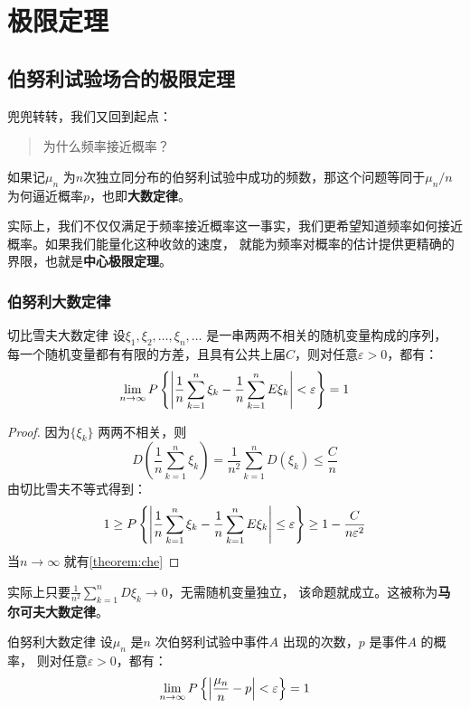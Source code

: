 \chapter{极限定理}
\section{伯努利试验场合的极限定理}
兜兜转转，我们又回到起点：
\begin{quote}
    为什么频率接近概率？
\end{quote}

如果记\(\mu_{n}\) 为\(n\)次独立同分布的伯努利试验中成功的频数，那这个问题等同于\(\mu_{n}/n\)
为何逼近概率\(p\)，也即\textbf{大数定律}。

实际上，我们不仅仅满足于频率接近概率这一事实，我们更希望知道频率如何接近概率。如果我们能量化这种收敛的速度，
就能为频率对概率的估计提供更精确的界限，也就是\textbf{中心极限定理}。

\subsection{伯努利大数定律}
\begin{theorem}[che]{切比雪夫大数定律}
    设\(\xi_{1}, \xi_2, \dots ,\xi_{n},\dots \) 是一串两两不相关的随机变量构成的序列，
    每一个随机变量都有有限的方差，且具有公共上届\(C\)，则对任意\(\varepsilon>0\)，都有：
    \[
        \lim_{n \to \infty} P\left\{\left|\frac{1}{n} \sum_{k=1}^{n} \xi_{k} -
        \frac{1}{n} \sum_{k=1}^{n} E\xi_{k}\right| < \varepsilon\right\} = 1
    \]
\end{theorem}

\begin{proof}
    因为\(\{\xi_{k}\}\) 两两不相关，则\[
        D\left( \frac{1}{n} \sum_{k=1}^{n} \xi_{k} \right) =
        \frac{1}{n^2} \sum_{k=1}^{n} D(\xi_{k}) \leq \frac{C}{n}
    \]
    由切比雪夫不等式得到：
    \[
        1 \geq P\left\{\left|\frac{1}{n} \sum_{k=1}^{n} \xi_{k} -
        \frac{1}{n} \sum_{k=1}^{n} E\xi_{k}\right| \leq  \varepsilon\right\} \geq
        1- \frac{C}{n\varepsilon^2}
    \]
    当\(n\to \infty\) 就有\cref{theorem:che}
\end{proof}

实际上只要\(\frac{1}{n^{2}} \sum_{k=1}^{n} D\xi_{k} \to 0\)，无需随机变量独立，
该命题就成立。这被称为\textbf{马尔可夫大数定律}。

\begin{theorem}{伯努利大数定律}
    设\(\mu_{n}\) 是\(n\) 次伯努利试验中事件\(A\) 出现的次数，\(p\) 是事件\(A\) 的概率，
    则对任意\(\varepsilon>0\)，都有：
    \[
        \lim_{n \to \infty} P\left\{\left| \frac{\mu_{n}}{n} - p\right| < \varepsilon\right\} = 1
    \]
\end{theorem}

